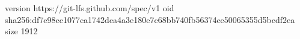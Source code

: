 version https://git-lfs.github.com/spec/v1
oid sha256:df7e98cc1077ca1742dea4a3e180e7c68bb740fb56374ce50065355d5bcdf2ea
size 1912

